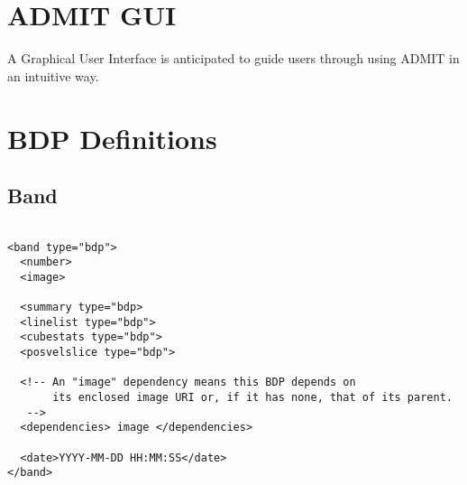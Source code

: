 \documentclass{article}
\begin{document}
%
%
%
%
%  
%
%
%
%

\section{ADMIT GUI}

A Graphical User Interface is anticipated to guide users through 
using ADMIT in an intuitive way. 

\appendix
\section{BDP Definitions}

\subsection{Band}
\footnotesize
\begin{verbatim}

<band type="bdp">
  <number>
  <image>

  <summary type="bdp>
  <linelist type="bdp">
  <cubestats type="bdp">
  <posvelslice type="bdp">

  <!-- An "image" dependency means this BDP depends on 
       its enclosed image URI or, if it has none, that of its parent.
   -->
  <dependencies> image </dependencies>

  <date>YYYY-MM-DD HH:MM:SS</date>
</band>

\end{verbatim}
\end{document}
